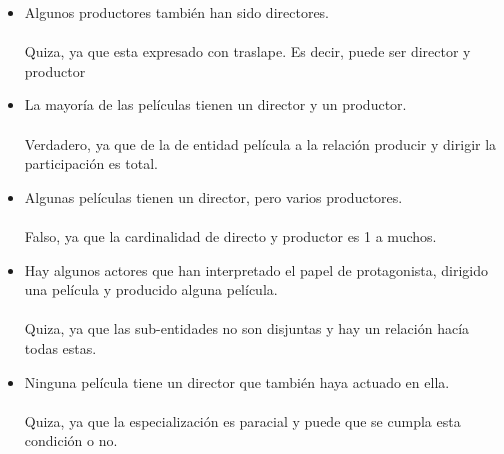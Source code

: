 \documentclass{article}
\begin{document}
\begin{enumerate}
\begin{itemize}
				\item Algunos productores también han sido directores.
				\\\\Quiza, ya que esta expresado con traslape. Es decir, puede ser director y productor\\
				\item La mayoría de las películas tienen un director y un productor.
				\\\\Verdadero, ya que de la de entidad película a la relación producir y dirigir la participación es total.\\ 
				\item Algunas películas tienen un director, pero varios productores.
				\\\\Falso, ya que la cardinalidad de directo y productor es 1 a muchos.\\
				\item Hay algunos actores que han interpretado el papel de protagonista, dirigido una película y
				producido alguna película.
				\\\\Quiza, ya que las sub-entidades no son disjuntas y hay un relación hacía todas estas.\\
				\item Ninguna película tiene un director que también haya actuado en ella.
				\\\\Quiza, ya que la especialización es paracial y puede que se cumpla esta condición o no.\\
			\end{itemize}
	\end{enumerate}
\end{document}
